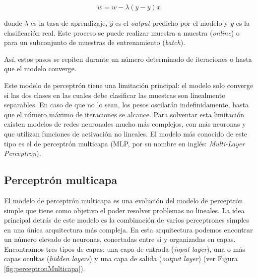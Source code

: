\documentclass[11pt,spanish,listoffigures,listoftables]{tfgetsinf}
\begin{document}
\begin{equation}
w = w - \lambda(\hat{y}-y)x
\end{equation}

donde $\lambda$ es la tasa de aprendizaje, $\hat{y}$ es el \textit{output} predicho por el modelo y $y$ es la clasificación real. Este proceso se puede realizar muestra a muestra (\textit{online}) o para un subconjunto de muestras de entrenamiento (\textit{batch}).

Así, estos pasos se repiten durante un número determinado de iteraciones o hasta que el modelo converge.

Este modelo de perceptrón tiene una limitación principal: el modelo solo converge si las dos clases en las cuales debe clasificar las muestras son linealmente separables. En caso de que no lo sean, los pesos oscilarán indefinidamente, hasta que el número máximo de iteraciones se alcance. Para solventar esta limitación existen modelos de redes neuronales mucho más complejos, con más neuronas y que utilizan funciones de activación no lineales. El modelo más conocido de este tipo es el de perceptrón multicapa (MLP, por su nombre en inglés: \textit{Multi-Layer Perceptron}).

\subsection{Perceptrón multicapa} \label{perceptronmulticapa}
El modelo de perceptrón multicapa es una evolución del modelo de perceptrón simple que tiene como objetivo el poder resolver problemas no lineales. La idea principal detrás de este modelo es la combinación de varios perceptrones simples en una única arquitectura más compleja. En esta arquitectura podemos encontrar un número elevado de neuronas, conectadas entre sí y organizadas en capas. Encontramos tres tipos de capas: una capa de entrada (\textit{input layer}), una o más capas ocultas (\textit{hidden layers}) y una capa de salida (\textit{output layer}) (ver Figura \ref{fig:perceptronMulticapa}).
\end{document}
